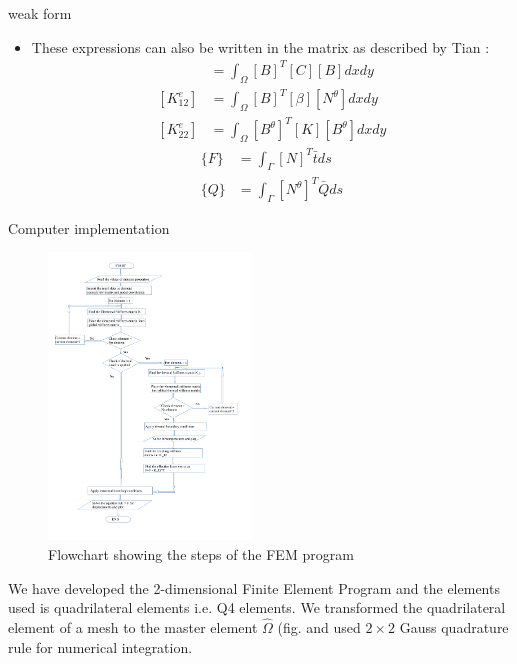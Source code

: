 \documentclass{beamer}
\begin{document}
\begin{frame}[t,fragile]{weak form}
    \tiny
\begin{itemize}
    \item These expressions can also be written in the matrix as described by Tian \cite{tian}:
\begin{align}
    [K_{11}^e]&=\int_{\Omega}[B]^T[C][B]dxdy\\
    [K_{12}^e]&=\int_{\Omega}[B]^T[\beta][N^{\theta}]dxdy\\
    [K_{22}^e]&=\int_{\Omega}[B^{\theta}]^T[K][B^{\theta}]dxdy
\end{align}
\begin{align}
    \{F\}&=\int_\Gamma [N]^T{\bar{t}}ds\\
    \{Q\}&=\int_\Gamma [N^{\theta}]^T\bar{Q}ds
    \label{}
\end{align}
\end{itemize}
\end{frame}
\begin{frame}[t,fragile]{Computer implementation}
\begin{figure}
  \begin{center}
      \vspace{-1.3cm}
\includegraphics[width=0.48\textwidth]{flow_chart.pdf}
  \end{center}
\caption{Flowchart showing the steps of the FEM program}
\end{figure}
We have developed the 2-dimensional Finite Element Program and the elements used is quadrilateral elements i.e. Q4 elements. We transformed the quadrilateral element of a mesh to the master element $\hat{\Omega}$ (fig. and used $2\times 2$ Gauss quadrature rule for numerical integration.

\end{frame}
\end{document}
